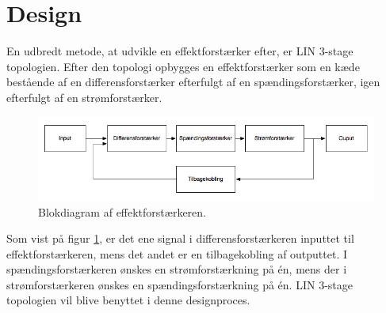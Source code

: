 \section{Design}
En udbredt metode, at udvikle en effektforstærker efter, er LIN 3-stage topologien. Efter den topologi opbygges en effektforstærker som en kæde bestående af en differensforstærker efterfulgt af en spændingsforstærker, igen efterfulgt af en strømforstærker. 

\begin{figure}[h]
\centering
\includegraphics[scale=0.5]{teknisk/effektforstaerker/blokdiagram-effektforstaerker.png}
\caption{Blokdiagram af effektforstærkeren.}
\label{fig:lin_effektforstaerker}
\end{figure}

Som vist på figur \ref{fig:lin_effektforstaerker}, er det ene signal i differensforstærkeren inputtet til effektforstærkeren, mens det andet er en tilbagekobling af outputtet. I spændingsforstærkeren ønskes en strømforstærkning på én, mens der i strømforstærkeren ønskes en spændingsforstærkning på én. LIN 3-stage topologien vil blive benyttet i denne designproces. 